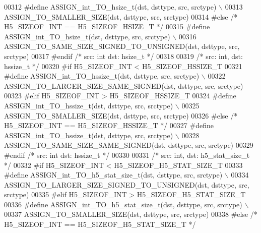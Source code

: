 \begin{DoxyCode}
00312 \textcolor{preprocessor}{    #define ASSIGN\_int\_TO\_hsize\_t(dst, dsttype, src, srctype) \(\backslash\)}
00313 \textcolor{preprocessor}{        ASSIGN\_TO\_SMALLER\_SIZE(dst, dsttype, src, srctype)}
00314 \textcolor{preprocessor}{#else }\textcolor{comment}{/* H5\_SIZEOF\_INT == H5\_SIZEOF\_HSIZE\_T */}\textcolor{preprocessor}{}
00315 \textcolor{preprocessor}{    #define ASSIGN\_int\_TO\_hsize\_t(dst, dsttype, src, srctype) \(\backslash\)}
00316 \textcolor{preprocessor}{        ASSIGN\_TO\_SAME\_SIZE\_SIGNED\_TO\_UNSIGNED(dst, dsttype, src, srctype)}
00317 \textcolor{preprocessor}{#endif }\textcolor{comment}{/* src: int dst: hsize\_t */}\textcolor{preprocessor}{}
00318 
00319 \textcolor{comment}{/* src: int, dst: hssize\_t */}
00320 \textcolor{preprocessor}{#if H5\_SIZEOF\_INT < H5\_SIZEOF\_HSSIZE\_T}
00321 \textcolor{preprocessor}{    #define ASSIGN\_int\_TO\_hssize\_t(dst, dsttype, src, srctype) \(\backslash\)}
00322 \textcolor{preprocessor}{        ASSIGN\_TO\_LARGER\_SIZE\_SAME\_SIGNED(dst, dsttype, src, srctype)}
00323 \textcolor{preprocessor}{#elif H5\_SIZEOF\_INT > H5\_SIZEOF\_HSSIZE\_T}
00324 \textcolor{preprocessor}{    #define ASSIGN\_int\_TO\_hssize\_t(dst, dsttype, src, srctype) \(\backslash\)}
00325 \textcolor{preprocessor}{        ASSIGN\_TO\_SMALLER\_SIZE(dst, dsttype, src, srctype)}
00326 \textcolor{preprocessor}{#else }\textcolor{comment}{/* H5\_SIZEOF\_INT == H5\_SIZEOF\_HSSIZE\_T */}\textcolor{preprocessor}{}
00327 \textcolor{preprocessor}{    #define ASSIGN\_int\_TO\_hssize\_t(dst, dsttype, src, srctype) \(\backslash\)}
00328 \textcolor{preprocessor}{        ASSIGN\_TO\_SAME\_SIZE\_SAME\_SIGNED(dst, dsttype, src, srctype)}
00329 \textcolor{preprocessor}{#endif }\textcolor{comment}{/* src: int dst: hssize\_t */}\textcolor{preprocessor}{}
00330 
00331 \textcolor{comment}{/* src: int, dst: h5\_stat\_size\_t */}
00332 \textcolor{preprocessor}{#if H5\_SIZEOF\_INT < H5\_SIZEOF\_H5\_STAT\_SIZE\_T}
00333 \textcolor{preprocessor}{    #define ASSIGN\_int\_TO\_h5\_stat\_size\_t(dst, dsttype, src, srctype) \(\backslash\)}
00334 \textcolor{preprocessor}{        ASSIGN\_TO\_LARGER\_SIZE\_SIGNED\_TO\_UNSIGNED(dst, dsttype, src, srctype)}
00335 \textcolor{preprocessor}{#elif H5\_SIZEOF\_INT > H5\_SIZEOF\_H5\_STAT\_SIZE\_T}
00336 \textcolor{preprocessor}{    #define ASSIGN\_int\_TO\_h5\_stat\_size\_t(dst, dsttype, src, srctype) \(\backslash\)}
00337 \textcolor{preprocessor}{        ASSIGN\_TO\_SMALLER\_SIZE(dst, dsttype, src, srctype)}
00338 \textcolor{preprocessor}{#else }\textcolor{comment}{/* H5\_SIZEOF\_INT == H5\_SIZEOF\_H5\_STAT\_SIZE\_T */}\textcolor{preprocessor}{}

\end{DoxyCode}
